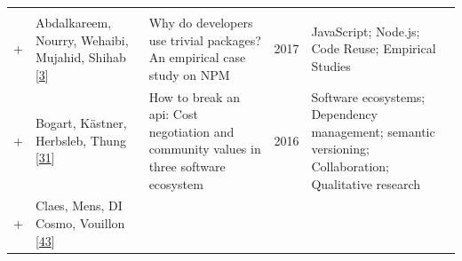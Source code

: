 \documentclass[]{book}
\begin{document}
\begin{longtable}[]{@{}lllll@{}}
\begin{minipage}[t]{0.39\columnwidth}
\strut
\end{minipage}\tabularnewline
\begin{minipage}[t]{0.01\columnwidth}\raggedright\strut
+\strut
\end{minipage} & \begin{minipage}[t]{0.09\columnwidth}\raggedright\strut
Abdalkareem, Nourry, Wehaibi, Mujahid, Shihab
{[}\protect\hyperlink{ref-Abdalkareem2017}{3}{]}\strut
\end{minipage} & \begin{minipage}[t]{0.34\columnwidth}\raggedright\strut
Why do developers use trivial packages? An empirical case study on
NPM\strut
\end{minipage} & \begin{minipage}[t]{0.02\columnwidth}\raggedright\strut
2017\strut
\end{minipage} & \begin{minipage}[t]{0.39\columnwidth}\raggedright\strut
JavaScript; Node.js; Code Reuse; Empirical Studies\strut
\end{minipage}\tabularnewline
\begin{minipage}[t]{0.01\columnwidth}\raggedright\strut
+\strut
\end{minipage} & \begin{minipage}[t]{0.09\columnwidth}\raggedright\strut
Bogart, Kästner, Herbsleb, Thung
{[}\protect\hyperlink{ref-Bogart2016}{31}{]}\strut
\end{minipage} & \begin{minipage}[t]{0.34\columnwidth}\raggedright\strut
How to break an api: Cost negotiation and community values in three
software ecosystem\strut
\end{minipage} & \begin{minipage}[t]{0.02\columnwidth}\raggedright\strut
2016\strut
\end{minipage} & \begin{minipage}[t]{0.39\columnwidth}\raggedright\strut
Software ecosystems; Dependency management; semantic versioning;
Collaboration; Qualitative research\strut
\end{minipage}\tabularnewline
\begin{minipage}[t]{0.01\columnwidth}\raggedright\strut
+\strut
\end{minipage} & \begin{minipage}[t]{0.09\columnwidth}\raggedright\strut
Claes, Mens, DI Cosmo, Vouillon
{[}\protect\hyperlink{ref-Claes2015}{43}{]}\strut
\end{minipage} & \begin{minipage}[t]{0.34\columnwidth}\raggedright\strut

\end{minipage}
\end{longtable}
\end{document}
